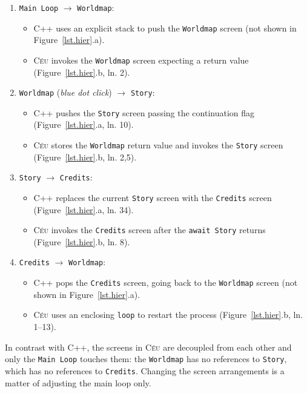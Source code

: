 \documentclass{vgtc}                          %
\newcommand{\CEU}{\textsc{C\'{e}u}\xspace}
\newcommand{\code}[1] {{\small{\texttt{#1}}}}
\begin{document}
\begin{enumerate}
\item \code{Main Loop} $\longrightarrow$ \code{Worldmap}:
    \begin{itemize}
    \item C++ uses an explicit stack to push the \code{Worldmap} screen (not
          shown in Figure~\ref{lst.hier}.a).
    \item \CEU invokes the \code{Worldmap} screen expecting a return value
          (Figure~\ref{lst.hier}.b, ln. 2).
    \end{itemize}
\item \code{Worldmap} (\emph{blue dot click}) $\longrightarrow$ \code{Story}:
    \begin{itemize}
    \item C++ pushes the \code{Story} screen passing the continuation flag
          (Figure~\ref{lst.hier}.a, ln. 10).
    \item \CEU stores the \code{Worldmap} return value and invokes the \code{Story} screen
          (Figure~\ref{lst.hier}.b, ln. 2,5).
    \end{itemize}
\item \code{Story} $\longrightarrow$ \code{Credits}:
    \begin{itemize}
    \item C++ replaces the current \code{Story} screen with the \code{Credits}
          screen (Figure~\ref{lst.hier}.a, ln. 34).
    \item \CEU invokes the \code{Credits} screen after the \code{await Story}
          returns (Figure~\ref{lst.hier}.b, ln. 8).
    \end{itemize}
\item \code{Credits} $\longrightarrow$ \code{Worldmap}:
    \begin{itemize}
    \item C++ pops the \code{Credits} screen, going back to the \code{Worldmap}
          screen (not shown in Figure~\ref{lst.hier}.a).
    \item \CEU uses an enclosing \code{loop} to restart the process
          (Figure~\ref{lst.hier}.b, ln. 1--13).
    \end{itemize}
\end{enumerate}

In contrast with C++, the screens in \CEU are decoupled from each other and
only the \code{Main Loop} touches them: the \code{Worldmap} has no references
to \code{Story}, which has no references to \code{Credits}.
Changing the screen arrangements is a matter of adjusting the main loop only.
\end{document}
